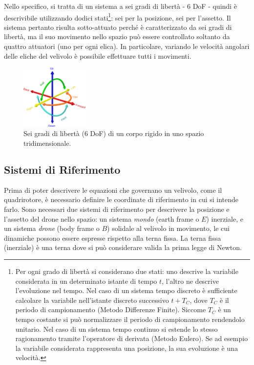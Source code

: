 Nello specifico, si tratta di un sistema a sei gradi di libertà - 6 \ac{DoF} - quindi è descrivibile utilizzando dodici stati\footnote{Per ogni grado di libertà si considerano due stati: uno descrive la variabile considerata in un determinato istante di tempo $t$, l'altro ne descrive l'evoluzione nel tempo. Nel caso di un sistema tempo discreto è sufficiente calcolare la variabile nell'istante discreto successivo $t + T_C$, dove $T_C$ è il periodo di campionamento (Metodo Differenze Finite). Siccome $T_C$ è un tempo costante si può normalizzare il periodo di campionamento rendendolo unitario. Nel caso di un sistema tempo continuo si estende lo stesso ragionamento tramite l'operatore di derivata (Metodo Eulero). Se ad esempio la variabile considerata rappresenta una posizione, la sua evoluzione è una velocità.}: sei per la posizione, sei per l'assetto. Il sistema pertanto risulta sotto-attuato perché è caratterizzato da sei gradi di libertà, ma il suo movimento nello spazio può essere controllato soltanto da quattro attuatori (uno per ogni elica). In particolare, variando le velocità angolari delle eliche del velivolo è possibile effettuare tutti i movimenti.

\begin{figure}[H]
    \centering
    \includegraphics[width=0.3\textwidth]{gfx/6dof}
    \caption[Sei gradi di libertà (6 \acs{DoF}) di un corpo rigido in uno spazio tridimensionale.]{Sei gradi di libertà (6 \acs{DoF}) di un corpo rigido in uno spazio tridimensionale.}
\end{figure}

\subsection{Sistemi di Riferimento}

Prima di poter descrivere le equazioni che governano un velivolo, come il quadrirotore, è necessario definire le coordinate di riferimento in cui si intende farlo. Sono necessari due sistemi di riferimento per descrivere la posizione e l'assetto del drone nello spazio: un sistema \emph{mondo} (earth frame o $E$) inerziale, e un sistema \emph{drone} (body frame o $B$) solidale al velivolo in movimento, le cui dinamiche possono essere espresse rispetto alla terna fissa. La terna fissa (inerziale) è una terna dove si può considerare valida la prima legge di Newton.\\

